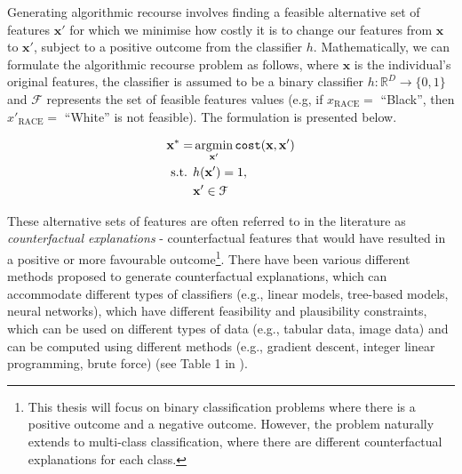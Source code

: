 Generating algorithmic recourse involves finding a feasible alternative set of features $\mathbf{x}'$ for which we minimise how costly it is to change our features from $\mathbf{x}$ to $\mathbf{x}'$, subject to a positive outcome from the classifier $h$. Mathematically, we can formulate the algorithmic recourse problem as follows, where $\mathbf{x}$ is the individual's original features, the classifier is assumed to be a binary classifier $h: \mathbb{R}^D \to \{0,1\}$ and $\mathcal{F}$ represents the set of feasible features values (e.g, if $x_{\text{RACE}}=$ ``Black'', then $x'_{\text{RACE}}=$ ``White'' is not feasible). The formulation is presented below.

\begin{align}
	\mathbf{x}^* = & \operatorname*{argmin}_{\mathbf{x}'}  \texttt{cost}(\mathbf{x}, \mathbf{x}') \\ \nonumber
	\text{s.t. } & h(\mathbf{x}') = 1, \\ \nonumber
	& \mathbf{x}' \in \mathcal{F}
\end{align}


These alternative sets of features are often referred to in the literature as \textit{counterfactual explanations} - counterfactual features that would have resulted in a positive or more favourable outcome\footnote{This thesis will focus on binary classification problems where there is a positive outcome and a negative outcome. However, the problem naturally extends to multi-class classification, where there are different counterfactual explanations for each class.}. There have been various different methods proposed to generate counterfactual explanations, which can accommodate different types of classifiers (e.g., linear models, tree-based models, neural networks), which have different feasibility and plausibility constraints, which can be used on different types of data (e.g., tabular data, image data) and can be computed using different methods (e.g., gradient descent, integer linear programming, brute force) (see Table 1 in \textcite{karimiSurveyAlgorithmicRecourse2022}).\\

